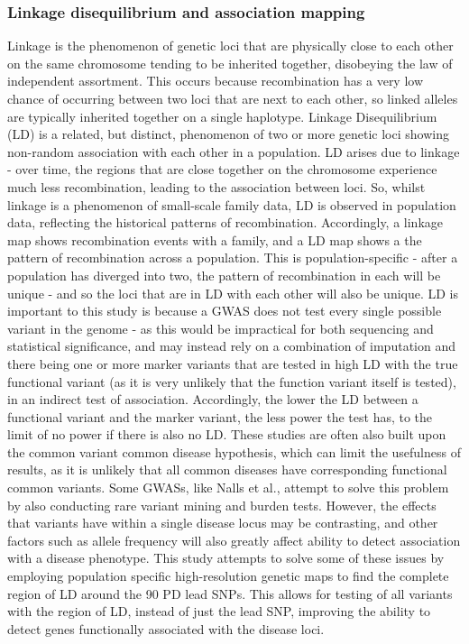 \documentclass{article}
\begin{document}
\subsubsection{Linkage disequilibrium and association mapping}
\label{subsubsec:linkage}
Linkage is the phenomenon of genetic loci that are physically close to each other on the same chromosome tending to be inherited together, disobeying the law of independent assortment. This occurs because recombination has a very low chance of occurring between two loci that are next to each other, so linked alleles are typically inherited together on a single haplotype. Linkage Disequilibrium (LD) is a related, but distinct, phenomenon of two or more genetic loci showing non-random association with each other\cite{Slatkin2008LinkageFuture} in a population. LD arises due to linkage - over time, the regions that are close together on the chromosome experience much less recombination, leading to the association between loci. So, whilst linkage is a phenomenon of small-scale family data, LD is observed in population data, reflecting the historical patterns of recombination. Accordingly, a linkage map shows recombination events with a family\cite{Lynn2004VARIATIONRECOMBINATION}, and a LD map shows a the pattern of recombination across a population. This is population-specific - after a population has diverged into two, the pattern of recombination in each will be unique - and so the loci that are in LD with each other will also be unique.
LD is important to this study is because a GWAS does not test every single possible variant in the genome - as this would be impractical for both sequencing and statistical significance, and may instead rely on a combination of imputation\cite{Dehghan2018Genome-WideStudies} and there being one or more marker variants that are tested in high LD with the true functional variant (as it is very unlikely that the function variant itself is tested), in an indirect test of association\cite{Weiss2000HowSNPs}. Accordingly, the lower the LD between a functional variant and the marker variant, the less power the test has, to the limit of no power if there is also no LD. These studies are often also built upon the common variant common disease hypothesis, which can limit the usefulness of results, as it is unlikely that all common diseases have corresponding functional common variants\cite{Bodmer2008CommonDiseases}. Some GWASs, like Nalls et al.\cite{Nalls2019IdentificationStudies}, attempt to solve this problem by also conducting rare variant mining and burden tests. However, the effects that variants have within a single disease locus may be contrasting, and other factors such as allele frequency will also greatly affect ability to detect association with a disease phenotype\cite{Manolio2009FindingDiseases}.
This study attempts to solve some of these issues by employing population specific high-resolution genetic maps\cite{Maniatis2004PositionalDisequilibrium.} to find the complete region of LD around the 90 PD lead SNPs. This allows for testing of all variants with the region of LD, instead of just the lead SNP, improving the ability to detect genes functionally associated with the disease loci.
\end{document}

